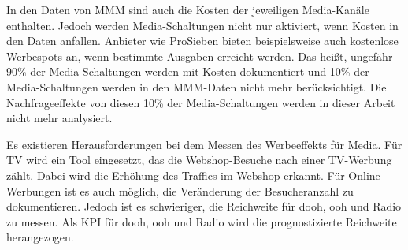 In den Daten von \ac{MMM} sind auch die Kosten der jeweiligen Media-Kanäle enthalten. Jedoch werden Media-Schaltungen nicht nur aktiviert, wenn Kosten in den Daten anfallen. Anbieter wie ProSieben bieten beispielsweise auch kostenlose Werbespots an, wenn bestimmte Ausgaben erreicht werden. Das heißt, ungefähr 90\% der Media-Schaltungen werden mit Kosten dokumentiert und 10\% der Media-Schaltungen werden in den \ac{MMM}-Daten nicht mehr berücksichtigt. Die Nachfrageeffekte von diesen 10\% der Media-Schaltungen werden in dieser Arbeit nicht mehr analysiert. \par
Es existieren Herausforderungen bei dem Messen des Werbeeffekts für Media. Für TV wird ein Tool eingesetzt, das die Webshop-Besuche nach einer TV-Werbung zählt. Dabei wird die Erhöhung des Traffics im Webshop erkannt. Für Online-Werbungen ist es auch möglich, die Veränderung der Besucheranzahl zu dokumentieren. Jedoch ist es schwieriger, die Reichweite für \ac{dooh}, \ac{ooh} und Radio zu messen. Als \ac{KPI} für \ac{dooh}, \ac{ooh} und Radio wird die prognostizierte Reichweite herangezogen.
